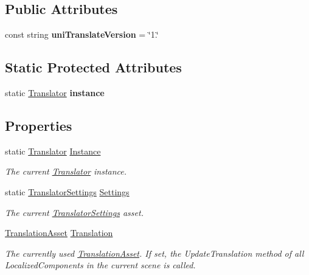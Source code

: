 \subsection*{Public Attributes}
\begin{DoxyCompactItemize}
\item 
const string {\bfseries uni\+Translate\+Version} = \char`\"{}1.\char`\"{}\hypertarget{class_translator_a62c024fc93bb86e0ecb63e7fa1783a5a}{}\label{class_translator_a62c024fc93bb86e0ecb63e7fa1783a5a}

\end{DoxyCompactItemize}
\subsection*{Static Protected Attributes}
\begin{DoxyCompactItemize}
\item 
static \hyperlink{class_translator}{Translator} {\bfseries instance}\hypertarget{class_translator_ab80f7408ad3912619056b9125336c158}{}\label{class_translator_ab80f7408ad3912619056b9125336c158}

\end{DoxyCompactItemize}
\subsection*{Properties}
\begin{DoxyCompactItemize}
\item 
static \hyperlink{class_translator}{Translator} \hyperlink{class_translator_a72c84ed89a4595faa92d191f911a5bf4}{Instance}
\begin{DoxyCompactList}\small\item\em The current \hyperlink{class_translator}{Translator} instance. \end{DoxyCompactList}\item 
static \hyperlink{class_translator_settings}{Translator\+Settings} \hyperlink{class_translator_a2d3689fa017bbfbe57d38dba4e359941}{Settings}
\begin{DoxyCompactList}\small\item\em The current \hyperlink{class_translator_settings}{Translator\+Settings} asset. \end{DoxyCompactList}\item 
\hyperlink{class_translation_asset}{Translation\+Asset} \hyperlink{class_translator_af3c31a41df2a540fa0bd94f92b69209e}{Translation}
\begin{DoxyCompactList}\small\item\em The currently used \hyperlink{class_translation_asset}{Translation\+Asset}. If set, the Update\+Translation method of all Localized\+Components in the current scene is called. \end{DoxyCompactList}\end{DoxyCompactItemize}


